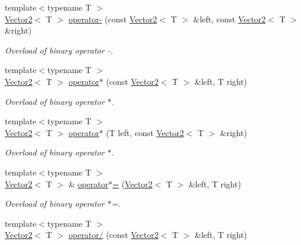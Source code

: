 \begin{DoxyCompactItemize}
{\footnotesize template$<$typename T $>$ }\\\hyperlink{class_triton_1_1_util_1_1_vector2}{Vector2}$<$ T $>$ \hyperlink{class_triton_1_1_util_1_1_vector2_ad027adae53ec547a86c20deeb05c9e85}{operator-\/} (const \hyperlink{class_triton_1_1_util_1_1_vector2}{Vector2}$<$ T $>$ \&left, const \hyperlink{class_triton_1_1_util_1_1_vector2}{Vector2}$<$ T $>$ \&right)
\begin{DoxyCompactList}\small\item\em Overload of binary operator -\/. \end{DoxyCompactList}\item 
{\footnotesize template$<$typename T $>$ }\\\hyperlink{class_triton_1_1_util_1_1_vector2}{Vector2}$<$ T $>$ \hyperlink{class_triton_1_1_util_1_1_vector2_a5f48ca928995b41c89f155afe8d16b02}{operator$\ast$} (const \hyperlink{class_triton_1_1_util_1_1_vector2}{Vector2}$<$ T $>$ \&left, T right)
\begin{DoxyCompactList}\small\item\em Overload of binary operator $\ast$. \end{DoxyCompactList}\item 
{\footnotesize template$<$typename T $>$ }\\\hyperlink{class_triton_1_1_util_1_1_vector2}{Vector2}$<$ T $>$ \hyperlink{class_triton_1_1_util_1_1_vector2_ad8b3e1cf7b156a984bc1427539ca8605}{operator$\ast$} (T left, const \hyperlink{class_triton_1_1_util_1_1_vector2}{Vector2}$<$ T $>$ \&right)
\begin{DoxyCompactList}\small\item\em Overload of binary operator $\ast$. \end{DoxyCompactList}\item 
{\footnotesize template$<$typename T $>$ }\\\hyperlink{class_triton_1_1_util_1_1_vector2}{Vector2}$<$ T $>$ \& \hyperlink{class_triton_1_1_util_1_1_vector2_abea24cb28c0d6e2957e259ba4e65d70e}{operator$\ast$=} (\hyperlink{class_triton_1_1_util_1_1_vector2}{Vector2}$<$ T $>$ \&left, T right)
\begin{DoxyCompactList}\small\item\em Overload of binary operator $\ast$=. \end{DoxyCompactList}\item 
{\footnotesize template$<$typename T $>$ }\\\hyperlink{class_triton_1_1_util_1_1_vector2}{Vector2}$<$ T $>$ \hyperlink{class_triton_1_1_util_1_1_vector2_a7409dd89cb3aad6c3bc6622311107311}{operator/} (const \hyperlink{class_triton_1_1_util_1_1_vector2}{Vector2}$<$ T $>$ \&left, T right)

\end{DoxyCompactItemize}
